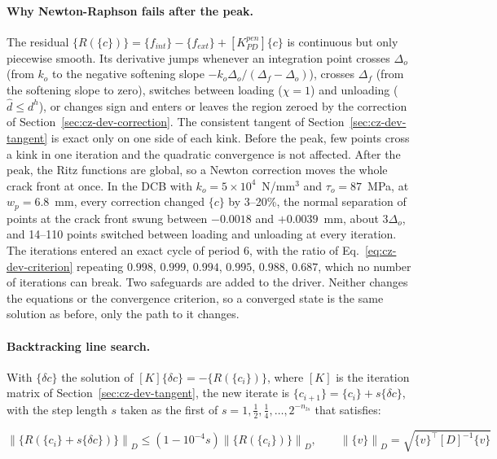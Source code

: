\paragraph{Why Newton-Raphson fails after the peak.} The residual $\{R(\{c\})\} = \{f_{int}\} - \{f_{ext}\} + [K^{pen}_{PD}]\{c\}$ is continuous but only piecewise smooth. Its derivative jumps whenever an integration point crosses $\Delta_o$ (from $k_o$ to the negative softening slope $-k_o \Delta_o/(\Delta_f - \Delta_o)$), crosses $\Delta_f$ (from the softening slope to zero), switches between loading ($\chi = 1$) and unloading ($\hat d \le d^h$), or changes sign and enters or leaves the region zeroed by the correction of Section~\ref{sec:cz-dev-correction}. The consistent tangent of Section~\ref{sec:cz-dev-tangent} is exact only on one side of each kink. Before the peak, few points cross a kink in one iteration and the quadratic convergence is not affected. After the peak, the Ritz functions are global, so a Newton correction moves the whole crack front at once. In the DCB with $k_o = 5 \times 10^4$~N/mm$^3$ and $\tau_o = 87$~MPa, at $w_p = 6.8$~mm, every correction changed $\{c\}$ by 3--20\%, the normal separation of points at the crack front swung between $-0.0018$ and $+0.0039$~mm, about $3 \Delta_o$, and 14--110 points switched between loading and unloading at every iteration. The iterations entered an exact cycle of period 6, with the ratio of Eq.~\ref{eq:cz-dev-criterion} repeating $0.998$, $0.999$, $0.994$, $0.995$, $0.988$, $0.687$, which no number of iterations can break. Two safeguards are added to the driver. Neither changes the equations or the convergence criterion, so a converged state is the same solution as before, only the path to it changes.

\paragraph{Backtracking line search.} With $\{\delta c\}$ the solution of $[K]\{\delta c\} = -\{R(\{c_i\})\}$, where $[K]$ is the iteration matrix of Section~\ref{sec:cz-dev-tangent}, the new iterate is $\{c_{i+1}\} = \{c_i\} + s\{\delta c\}$, with the step length $s$ taken as the first of $s = 1, \frac{1}{2}, \frac{1}{4}, \dots, 2^{-n_{ls}}$ that satisfies:

\begin{equation}\label{eq:cz-dev-armijo}
	\left\| \{R(\{c_i\} + s\{\delta c\})\} \right\|_D \le \left(1 - 10^{-4} s\right) \left\| \{R(\{c_i\})\} \right\|_D, \qquad
	\left\| \{v\} \right\|_D = \sqrt{\{v\}^\top [D]^{-1} \{v\}}
\end{equation}

